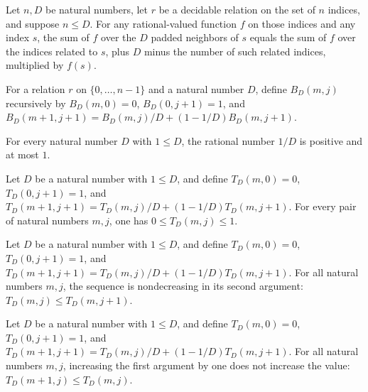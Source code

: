\begin{theorem}
\label{Randomized.sum_padNbr}
\leanok
{}
Let $n,D$ be natural numbers, let $r$ be a decidable relation on the set of $n$ indices,
and suppose $n\le D$. For any rational-valued function $f$ on those indices and any
index $s$, the sum of $f$ over the $D$ padded neighbors of $s$ equals the sum of $f$
over the indices related to $s$, plus $D$ minus the number of such related indices,
multiplied by $f(s)$.
\end{theorem}

\begin{definition}
\label{Randomized.binTail}
\leanok
For a relation $r$ on $\{0,\ldots,n-1\}$ and a natural number $D$, define $B_D(m,j)$
recursively by $B_D(m,0)=0$, $B_D(0,j+1)=1$, and
$B_D(m+1,j+1)=B_D(m,j)/D+(1-1/D)B_D(m,j+1)$.
\end{definition}

\begin{theorem}
\label{Randomized.one_div_mem}
\leanok
{}
For every natural number $D$ with $1 \le D$, the rational number $1/D$ is positive and
at most $1$.
\end{theorem}

\begin{theorem}
\label{Randomized.binTail_mem_Icc}
\leanok
{}
Let $D$ be a natural number with $1\le D$, and define $T_D(m,0)=0$, $T_D(0,j+1)=1$, and
$T_D(m+1,j+1)=T_D(m,j)/D+(1-1/D)T_D(m,j+1)$. For every pair of natural numbers $m,j$,
one has $0\le T_D(m,j)\le 1$.
\end{theorem}

\begin{theorem}
\label{Randomized.binTail_mono}
\leanok
{}
Let $D$ be a natural number with $1\le D$, and define $T_D(m,0)=0$, $T_D(0,j+1)=1$, and
$T_D(m+1,j+1)=T_D(m,j)/D+(1-1/D)T_D(m,j+1)$. For all natural numbers $m,j$, the sequence
is nondecreasing in its second argument: $T_D(m,j)\le T_D(m,j+1)$.
\end{theorem}

\begin{theorem}
\label{Randomized.binTail_succ_le}
\leanok
{}
Let $D$ be a natural number with $1\le D$, and define $T_D(m,0)=0$, $T_D(0,j+1)=1$, and
$T_D(m+1,j+1)=T_D(m,j)/D+(1-1/D)T_D(m,j+1)$. For all natural numbers $m,j$, increasing
the first argument by one does not increase the value: $T_D(m+1,j)\le T_D(m,j)$.
\end{theorem}

